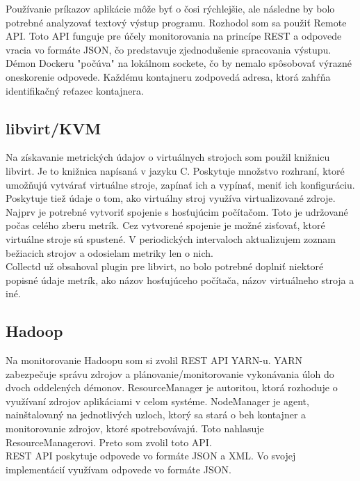 \documentclass[11pt,final,oneside]{fithesis}
\begin{document}
Používanie príkazov aplikácie môže byť o čosi rýchlejšie, ale následne by bolo potrebné analyzovať textový výstup programu.
Rozhodol som sa použiť Remote API. Toto API funguje pre účely monitorovania na princípe REST a odpovede vracia vo formáte JSON, čo predstavuje zjednodušenie spracovania výstupu. Démon Dockeru "počúva" na 
lokálnom sockete, čo by nemalo spôsobovať výrazné oneskorenie odpovede. Každému kontajneru zodpovedá adresa, ktorá zahŕňa identifikačný reťazec kontajnera.

\subsection{libvirt/KVM}
Na získavanie metrických údajov o virtuálnych strojoch som použil knižnicu libvirt. Je to knižnica napísaná v jazyku C. Poskytuje množstvo
rozhraní, ktoré umožňujú vytvárať virtuálne stroje, zapínať ich a vypínať, meniť ich konfiguráciu. Poskytuje tiež údaje o tom, ako virtuálny
stroj využíva virtualizované zdroje. 
\\Najprv je potrebné vytvoriť spojenie s hosťujúcim počítačom. Toto je udržované počas celého zberu metrík. Cez vytvorené spojenie
je možné zisťovať, ktoré virtuálne stroje sú spustené. V periodických intervaloch aktualizujem zoznam bežiacich strojov a odosielam
metriky len o nich.
\\Collectd už obsahoval plugin pre libvirt, no bolo potrebné doplniť niektoré popisné údaje metrík, ako názov hosťujúceho počítača,
názov virtuálneho stroja a iné.

\subsection{Hadoop}
Na monitorovanie Hadoopu som si zvolil REST API YARN-u. YARN zabezpečuje správu zdrojov a plánovanie/monitorovanie vykonávania úloh do dvoch
oddelených démonov.\cite{23} ResourceManager je autoritou, ktorá rozhoduje o využívaní zdrojov aplikáciami v celom systéme. NodeManager
je agent, nainštalovaný na jednotlivých uzloch, ktorý sa stará o beh kontajner a monitorovanie zdrojov, ktoré spotrebovávajú. Toto
nahlasuje ResourceManagerovi. Preto som zvolil toto API.
\\REST API poskytuje odpovede vo formáte JSON a XML. Vo svojej implementácií využívam odpovede vo formáte JSON.
\end{document}
